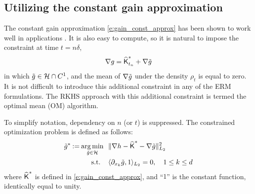 \subsection{Utilizing the constant gain approximation}
\label{s:RKHS_OM}




The constant gain approximation \eqref{e:gain_const_approx} has been shown to work well in applications \cite{tilghiomeh13}. It is also easy to compute, so it is natural to impose the constraint at time $t=n\delta$,
\[
\nabla g =  \widehat{\text{\sf K}}^*_{t_n} +  \nabla \tilde g
\]
in which $\tilde g\in {\cal H} \cap C^1$,  and the mean of  $ \nabla \tilde g$ under the density $\rho_t$ is equal to zero.
It is not difficult to introduce this additional constraint in any of the ERM formulations.  The RKHS approach with this additional constraint is termed the optimal mean (OM) algorithm.


To simplify notation, dependency on $n$ (or $t$) is suppressed. The constrained optimization problem is defined as follows:
\[
\begin{aligned}
\tilde g^*  \mathbin{:=} \mathop{\rm arg{\,}min}_{\tilde g\in{\cal H}} \ \  &   \| \nabla h - \widehat{\text{\sf K}}^* - \nabla \tilde g \|^2_{L_2} \\
\text{s.t. }  \ \   & \langle \partial_{x_k} \tilde g , 1 \rangle_{L_2} = 0, \quad     1\le  k \le d
\end{aligned}
\]
where $\widehat{\text{\sf K}}^*$ is defined in \eqref{e:gain_const_approx},  and ``$1$'' is the constant function, identically equal to unity.


